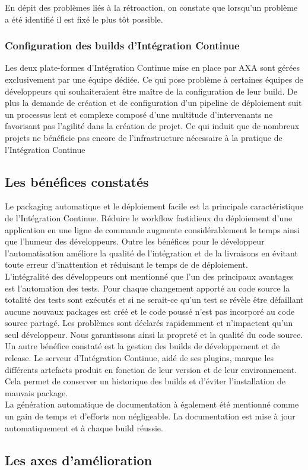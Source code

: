       En dépit des problèmes liés à la rétroaction, on constate que lorsqu'un problème a été identifié il est fixé le plus tôt possible.

      \subsubsection{Configuration des builds d'Intégration Continue}
      Les deux plate-formes d'Intégration Continue mise en place par AXA sont gérées exclusivement par une équipe dédiée. Ce qui pose problème à certaines équipes de développeurs qui souhaiteraient être maître de la configuration de leur build. De plus la demande de création et de configuration d'un pipeline de déploiement suit un processus lent et complexe composé d'une multitude d'intervenants ne favorisant pas l'agilité dans la création de projet. Ce qui induit que de nombreux projets ne bénéficie pas encore de l'infrastructure nécessaire à la pratique de l'Intégration Continue

    \subsection{Les bénéfices constatés}
    Le packaging automatique et le déploiement facile est la principale caractéristique de l'Intégration Continue. Réduire le workflow fastidieux du déploiement d'une application en une ligne de commande augmente considérablement le temps ainsi que l'humeur des développeurs. Outre les bénéfices pour le développeur l'automatisation améliore la qualité de l'intégration et de la livraisons en évitant toute erreur d'inattention et réduisant le temps de de déploiement.\\

    L'intégralité des développeurs ont mentionné que l'un des principaux avantages est l'automation des tests. Pour chaque changement apporté au code source la totalité des tests sont exécutés et si ne serait-ce qu'un test se révèle être défaillant aucune nouvaux packages est créé et le code poussé n'est pas incorporé au code source partagé. Les problèmes sont déclarés rapidemment et n'impactent qu'un seul développeur. Nous garantissons ainsi la propreté et la qualité du code source.\\

    Un autre bénéfice constaté est la gestion des builds de développement et de release. Le serveur d'Intégration Continue, aidé de ses plugins, marque les différents artefacts produit en fonction de leur version et de leur environnement. Cela permet de conserver un historique des builds et d'éviter l'installation de mauvais package.\\

    La génération automatique de documentation à également été mentionné comme un gain de temps et d'efforts non négligeable. La documentation est mise à jour automatiquement et à chaque build réussie.\\

    \subsection{Les axes d'amélioration}
